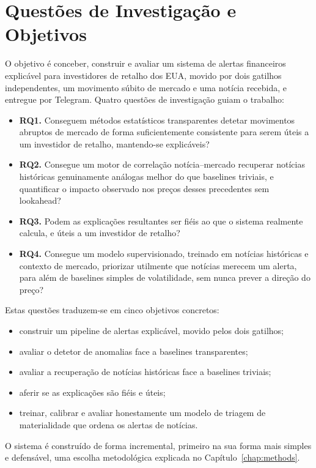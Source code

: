 \section{Questões de Investigação e Objetivos}
\label{sec:intro_objectives}

O objetivo é conceber, construir e avaliar um sistema de alertas financeiros explicável para investidores de
retalho dos EUA, movido por dois gatilhos independentes, um movimento súbito de mercado e uma notícia
recebida, e entregue por Telegram. Quatro questões de investigação guiam o trabalho:

\begin{itemize}
  \item \textbf{\gls{RQ}1.} Conseguem métodos estatísticos transparentes detetar movimentos abruptos de
        mercado de forma suficientemente consistente para serem úteis a um investidor de retalho,
        mantendo-se explicáveis?
  \item \textbf{\gls{RQ}2.} Consegue um motor de correlação notícia--mercado recuperar notícias históricas
        genuinamente análogas melhor do que baselines triviais, e quantificar o impacto observado nos preços
        desses precedentes sem lookahead?
  \item \textbf{\gls{RQ}3.} Podem as explicações resultantes ser fiéis ao que o sistema realmente calcula, e
        úteis a um investidor de retalho?
  \item \textbf{\gls{RQ}4.} Consegue um modelo supervisionado, treinado em notícias históricas e contexto de
        mercado, priorizar utilmente que notícias merecem um alerta, para além de baselines simples de
        volatilidade, sem nunca prever a direção do preço?
\end{itemize}

Estas questões traduzem-se em cinco objetivos concretos:
\begin{itemize}
  \item construir um pipeline de alertas explicável, movido pelos dois gatilhos;
  \item avaliar o detetor de anomalias face a baselines transparentes;
  \item avaliar a recuperação de notícias históricas face a baselines triviais;
  \item aferir se as explicações são fiéis e úteis;
  \item treinar, calibrar e avaliar honestamente um modelo de triagem de materialidade que ordena os alertas
        de notícias.
\end{itemize}
O sistema é construído de forma incremental, primeiro na sua forma mais simples e defensável, uma escolha
metodológica explicada no Capítulo~\ref{chap:methods}.

